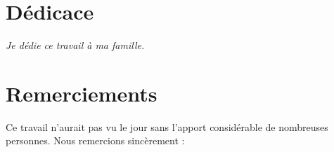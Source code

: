 \documentclass[12pt, a4paper, oneside]{report}
\begin{document}
	\pagenumbering{roman}
	\setcounter{page}{1}
	
	\chapter*{Dédicace}
	\thispagestyle{plain}
	
	\vspace{4cm}
	\begin{flushright}
		\begin{minipage}{0.6\textwidth}
			\itshape\large
			Je dédie ce travail à ma famille.
		\end{minipage}
	\end{flushright}
	\vfill
	
	\chapter*{Remerciements}
	\thispagestyle{plain}
	Ce travail n'aurait pas vu le jour sans l'apport considérable de 
	 nombreuses personnes. Nous remercions sincèrement :
	
\end{document}
